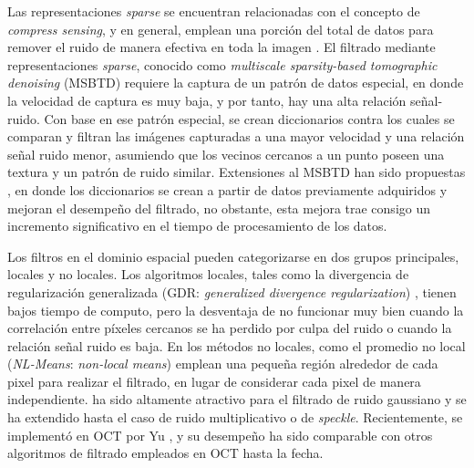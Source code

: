 Las representaciones \textit{sparse} se encuentran relacionadas con el concepto de \textit{compress sensing}, y en general, emplean una porción del total de datos para remover el ruido de manera efectiva en toda la imagen \cite{Xu2012,Fang2012,Fang2013,Fang2015}. El filtrado mediante representaciones \textit{sparse}, conocido como \textit{multiscale sparsity-based tomographic denoising} (MSBTD) \cite{Fang2012} requiere la captura de un patrón de datos especial, en donde la velocidad de captura es muy baja, y por tanto, hay una alta relación señal-ruido. Con base en ese patrón especial, se crean diccionarios contra los cuales se comparan y filtran las imágenes capturadas a una mayor velocidad y una relación señal ruido menor, asumiendo que los vecinos cercanos a un punto poseen una textura y un patrón de ruido similar. Extensiones al MSBTD han sido propuestas \cite{Fang2013, Fang2015}, en donde los diccionarios se crean a partir de datos previamente adquiridos y mejoran el desempeño del filtrado, no obstante, esta mejora trae consigo un incremento significativo en el tiempo de procesamiento de los datos.

Los filtros en el dominio espacial pueden categorizarse en dos grupos principales, locales y no locales. Los algoritmos locales, tales como la divergencia de regularización generalizada (GDR: \textit{generalized divergence regularization}) \cite{Cheng2012}, tienen bajos tiempo de computo, pero la desventaja de no funcionar muy bien cuando la correlación entre píxeles cercanos se ha perdido por culpa del ruido o cuando la relación señal ruido es baja. En los métodos no locales, como el promedio no local (\textit{NL-Means}: \textit{non-local means}) \cite{Baudes2005, Deledalle2009} emplean una pequeña región alrededor de cada pixel para realizar el filtrado, en lugar de considerar cada pixel de manera independiente. \nlmeans ha sido altamente atractivo para el filtrado de ruido gaussiano y se ha extendido hasta el caso de ruido multiplicativo o de \textit{speckle}. Recientemente, \nlmeans se implementó en OCT por Yu \etal \cite{Yu2016}, y su desempeño ha sido comparable con otros algoritmos de filtrado empleados en OCT hasta la fecha.


